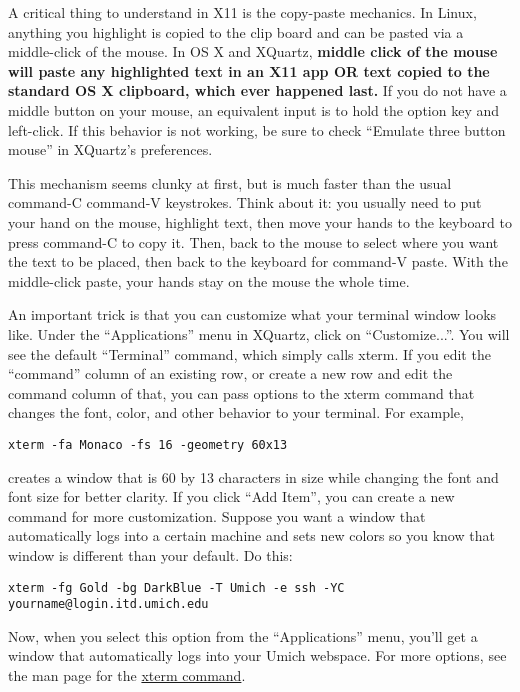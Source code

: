 \documentclass[12pt, letterpaper]{article}
\begin{document}
A critical thing to understand in X11 is the copy-paste mechanics. In Linux,
anything you highlight is copied to the clip board and can be pasted
via a middle-click of the mouse.  In OS X and XQuartz, \textbf{middle click
  of the mouse will paste any highlighted text in an X11 app OR text copied
  to the standard OS X clipboard, which ever happened last.}  If you do not
have a middle button on your mouse, an equivalent input is to hold the option
key and left-click.  If this behavior
is not working, be sure to check ``Emulate three button mouse'' in
XQuartz's preferences.  

This mechanism seems clunky at first, but is much
faster than the usual command-C command-V keystrokes.  Think about it:
you usually need to put your hand on the mouse, highlight text, then move
your hands to the keyboard to press command-C to copy it.  Then, back to the
mouse to select where you want the text to be placed, then back to the
keyboard for command-V paste.  With the middle-click paste, your hands stay on
the mouse the whole time.

An important trick is that you can customize what your terminal window looks
like.  Under the ``Applications'' menu in XQuartz, click on ``Customize...''.
You will see the default ``Terminal'' command, which simply calls xterm.
If you edit the ``command'' column of an existing row, or create a new row and
edit the command column of that, you can pass options to the xterm command
that changes the font, color, and other behavior to your terminal.  For example,
\begin{verbatim}
xterm -fa Monaco -fs 16 -geometry 60x13
\end{verbatim}
creates a window that is 60 by 13 characters in size while changing the font and
font size for better clarity.  If you click ``Add Item'', you can create a new
command for more customization.  Suppose you want a window that automatically
logs into a certain machine and sets new colors so you know that window is
different than your default.  Do this:
\begin{verbatim}
xterm -fg Gold -bg DarkBlue -T Umich -e ssh -YC yourname@login.itd.umich.edu
\end{verbatim}
Now, when you select this option from the ``Applications'' menu, you'll get
a window that automatically logs into your Umich webspace.  For more options,
see the man page for the
\href{http://linux.die.net/man/1/xterm}{xterm command}.  
\end{document}
